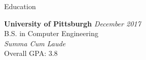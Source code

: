 \documentclass{resume} %
\begin{document}

\begin{rSection}{Education}

{\bf University of Pittsburgh} \hfill {\em December 2017} \\ 
B.S. in Computer Engineering \\
\textit{Summa Cum Laude} \\
Overall GPA: 3.8

\end{rSection}

\end{document}
